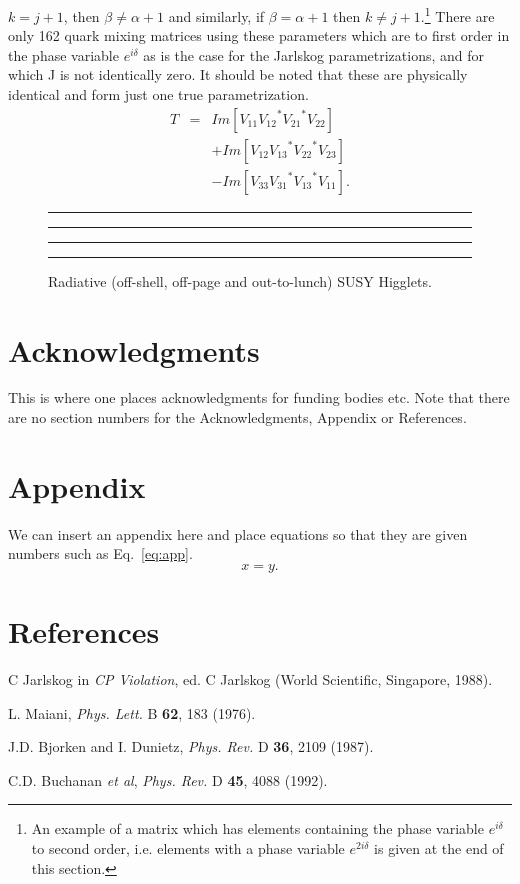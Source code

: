 \documentclass[11pt]{article}
\def\Journal#1#2#3#4{{#1} {\bf #2}, #3 (#4)}
\def\PLB{{\em Phys. Lett.}  B}
\def\PRD{{\em Phys. Rev.} D}
\def\be{\begin{equation}}
\def\ee{\end{equation}}
\def\bea{\begin{eqnarray}}
\def\eea{\end{eqnarray}}
\begin{document}
$k = j + 1$, then $\beta \neq \alpha + 1$ and similarly, if
$\beta = \alpha + 1$ then $ k \neq j + 1$.\footnote{An example of a
matrix which has elements
containing the phase variable $e^{i \delta}$ to second order, i.e.
elements with a
phase variable $e^{2i \delta}$ is given at the end of this section.}
   There are only 162 quark mixing matrices using these parameters
which are
to first order in the phase variable $e^{i \delta}$ as is the case for
the Jarlskog parametrizations, and for which J is not identically
zero.
It should be noted that these are physically identical and
form just one true parametrization.
\bea
T & = & Im[V_{11} {V_{12}}^* {V_{21}}^* V_{22}]  \nonumber \\
&  & + Im[V_{12} {V_{13}}^* {V_{22}}^* V_{23}]   \nonumber \\
&  & - Im[V_{33} {V_{31}}^* {V_{13}}^* V_{11}].
\label{eq:sp}
\eea


\begin{figure}
\rule{5cm}{0.2mm}\hfill\rule{5cm}{0.2mm}
\vskip 2.5cm
\rule{5cm}{0.2mm}\hfill\rule{5cm}{0.2mm}
\caption{Radiative (off-shell, off-page and out-to-lunch) SUSY Higglets.
\label{fig:radish}}
\end{figure}

\section*{Acknowledgments}
This is where one places acknowledgments for funding bodies etc.
Note that there are no section numbers for the Acknowledgments, Appendix
or References.

\section*{Appendix}
 We can insert an appendix here and place equations so that they are
given numbers such as Eq.~\ref{eq:app}.
\be
x = y.
\label{eq:app}
\ee
\section*{References}
\begin{thebibliography}{99}
C Jarlskog in {\em CP Violation}, ed. C Jarlskog
(World Scientific, Singapore, 1988).

L. Maiani, \Journal{\PLB}{62}{183}{1976}.

J.D. Bjorken and I. Dunietz, \Journal{\PRD}{36}{2109}{1987}.

C.D. Buchanan {\it et al}, \Journal{\PRD}{45}{4088}{1992}.

\end{thebibliography}
\end{document}
